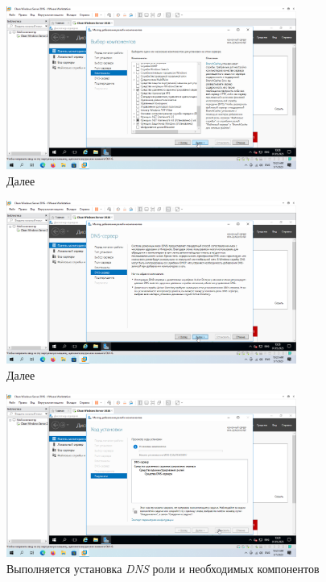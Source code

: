\documentclass[a4paper]{article}
\begin{document}
  \begin{figure}[H]
    \centering
    \includegraphics[width=0.85\textwidth]{9_0040}
    \caption{Далее}
    \label{img:0040}
  \end{figure}

  \begin{figure}[H]
    \centering
    \includegraphics[width=0.85\textwidth]{9_0041}
    \caption{Далее}
    \label{img:0041}
  \end{figure}

  \begin{figure}[H]
    \centering
    \includegraphics[width=0.85\textwidth]{9_0042}
    \caption{Выполняется установка \textit{DNS} роли и необходимых компонентов}
    \label{img:0042}
  \end{figure}
  
\end{document}
